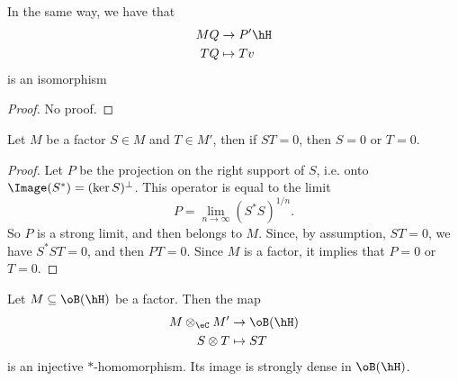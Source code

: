 \begin{proposition}
In the same way, we have that
\begin{equation}
\begin{aligned}
  MQ&\to P'\hH \\ 
   TQ&\mapsto Tv 
\end{aligned}
\end{equation}
is an isomorphism
\end{proposition}

\begin{proof}
No proof.
\end{proof}

\begin{proposition}
Let $M$ be a factor $S\in M$ and $T\in M'$, then if $ST=0$, then $S=0$ or $T=0$.
\end{proposition}

\begin{proof}
Let $P$ be the projection on the right support of $S$, i.e. onto $\Image(S^*)=(\ker S)^{\perp}$. This operator is equal to the limit
\[ 
  P=\lim_{n\to\infty}(S^*S)^{1/n}.
\]
So $P$ is a strong limit, and then belongs to $M$. Since, by assumption, $ST=0$, we have $S^*ST=0$, and then $PT=0$. Since $M$ is a factor, it implies that $P=0$ or $T=0$.
\end{proof}

\begin{proposition}
Let $M\subseteq\oB(\hH)$ be a factor. Then the map
\begin{equation}
\begin{aligned}
 M\otimes_{\eC}M'&\to \oB(\hH) \\ 
   S\otimes T&\mapsto ST 
\end{aligned}
\end{equation}
is an injective $*$-homomorphism. Its image is strongly dense in $\oB(\hH)$.
\end{proposition}

